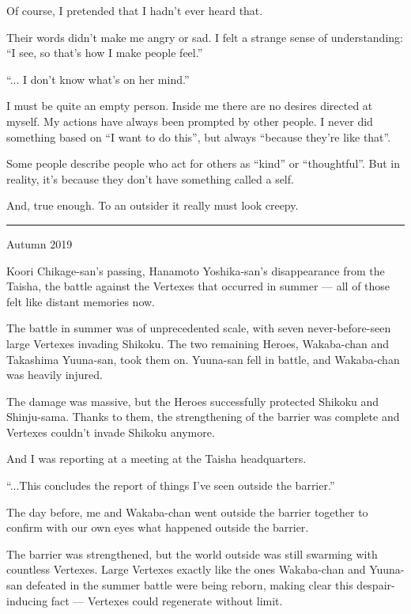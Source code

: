 Of course, I pretended that I hadn't ever heard that.

Their words didn't make me angry or sad. I felt a strange sense of understanding: ``I see, so that's how I make people feel.''

``... I don't know what's on her mind.''

I must be quite an empty person. Inside me there are no desires directed at myself. My actions have always been prompted by other people. I never did something based on ``I want to do this'', but always ``because they're like that''.

Some people describe people who act for others as ``kind'' or ``thoughtful''. But in reality, it's because they don't have something called a self.

And, true enough. To an outsider it really must look creepy.

\vspace{\baselineskip}
\hrule
\vspace{\baselineskip}

Autumn 2019

Koori Chikage-san's passing, Hanamoto Yoshika-san's disappearance from the Taisha, the battle against the Vertexes that occurred in summer --- all of those felt like distant memories now.

The battle in summer was of unprecedented scale, with seven never-before-seen large Vertexes invading Shikoku. The two remaining Heroes, Wakaba-chan and Takashima Yuuna-san, took them on. Yuuna-san fell in battle, and Wakaba-chan was heavily injured.

The damage was massive, but the Heroes successfully protected Shikoku and Shinju-sama. Thanks to them, the strengthening of the barrier was complete and Vertexes couldn't invade Shikoku anymore.

And I was reporting at a meeting at the Taisha headquarters.

``...This concludes the report of things I've seen outside the barrier.''

The day before, me and Wakaba-chan went outside the barrier together to confirm with our own eyes what happened outside the barrier.

The barrier was strengthened, but the world outside was still swarming with countless Vertexes. Large Vertexes exactly like the ones Wakaba-chan and Yuuna-san defeated in the summer battle were being reborn, making clear this despair-inducing fact --- Vertexes could regenerate without limit.


